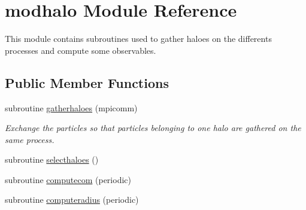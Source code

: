\hypertarget{classmodhalo}{\section{modhalo Module Reference}
\label{classmodhalo}
}


This module contains subroutines used to gather haloes on the differents processes and compute some observables.  


\subsection*{Public Member Functions}
\begin{DoxyCompactItemize}
\item 
subroutine \hyperlink{classmodhalo_ac4792a22c76a98fdd0bbdcf598b3adfe}{gatherhaloes} (mpicomm)
\begin{DoxyCompactList}\small\item\em Exchange the particles so that particles belonging to one halo are gathered on the same process. \end{DoxyCompactList}\item 
subroutine \hyperlink{classmodhalo_adc24616c9dd9294acd0c1d478f4333ad}{selecthaloes} ()
\item 
subroutine \hyperlink{classmodhalo_ac4afe524dd9d15d21ce67171c4a7ba70}{computecom} (periodic)
\item 
subroutine \hyperlink{classmodhalo_a873e8c6a5fd11756e18c33dd7a08ab7d}{computeradius} (periodic)
\end{DoxyCompactItemize}
